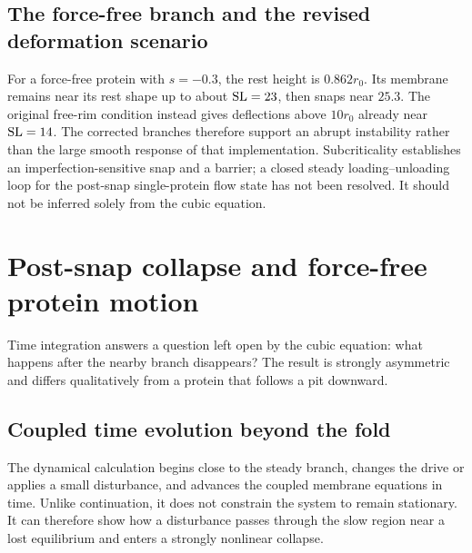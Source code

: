 

\subsection{The force-free branch and the revised deformation scenario}


For a force-free protein with $s=-0.3$, the rest height is $0.862r_0$. Its membrane remains near its rest shape up to about $\mathrm{SL}=23$, then snaps near $25.3$. The original free-rim condition instead gives deflections above $10r_0$ already near $\mathrm{SL}=14$. The corrected branches therefore support an abrupt instability rather than the large smooth response of that implementation. Subcriticality establishes an imperfection-sensitive snap and a barrier; a closed steady loading--unloading loop for the post-snap single-protein flow state has not been resolved. It should not be inferred solely from the cubic equation.




\section{Post-snap collapse and force-free protein motion}\label{sec:collapse}
Time integration answers a question left open by the cubic equation: what happens after the nearby branch disappears? The result is strongly asymmetric and differs qualitatively from a protein that follows a pit downward.


\subsection{Coupled time evolution beyond the fold}
The dynamical calculation begins close to the steady branch, changes the drive or applies a small disturbance, and advances the coupled membrane equations in time. Unlike continuation, it does not constrain the system to remain stationary. It can therefore show how a disturbance passes through the slow region near a lost equilibrium and enters a strongly nonlinear collapse.

